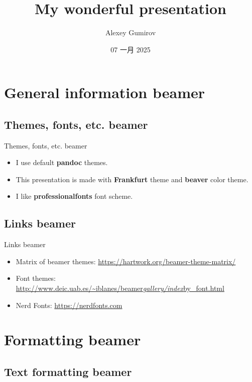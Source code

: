\documentclass[
  ignorenonframetext,
  aspectratio=169,
  aspectratio=169]{beamer}
\title{My wonderful presentation}
\author{Alexey Gumirov}
\date{07 一月 2025}
\institute{My home office}
\providecommand{\tightlist}{%
  \setlength{\itemsep}{0pt}\setlength{\parskip}{0pt}}
\providecommand{\tightlist}{%
  \setlength{\itemsep}{0pt}\setlength{\parskip}{0pt}}
\begin{document}
\frame{\titlepage}

\begin{frame}
  \tableofcontents[hideallsubsections]
\end{frame}
\section{General information beamer}\label{general-information-beamer}

\subsection{Themes, fonts, etc. beamer}\label{themes-fonts-etc.-beamer}

\begin{frame}{Themes, fonts, etc. beamer}
\begin{itemize}
\tightlist
\item
  I use default \textbf{pandoc} themes.
\item
  This presentation is made with \textbf{Frankfurt} theme and
  \textbf{beaver} color theme.
\item
  I like \textbf{professionalfonts} font scheme.
\end{itemize}
\end{frame}

\subsection{Links beamer}\label{links-beamer}

\begin{frame}{Links beamer}
\begin{itemize}
\tightlist
\item
  Matrix of beamer themes:
  \url{https://hartwork.org/beamer-theme-matrix/}
\item
  Font themes:
  \href{http://www.deic.uab.es/~iblanes/beamer_gallery/index_by_font.html}{http://www.deic.uab.es/\textasciitilde iblanes/beamer\emph{gallery/index}by\_font.html}
\item
  Nerd Fonts: \url{https://nerdfonts.com}
\end{itemize}
\end{frame}

\section{Formatting beamer}\label{formatting-beamer}

\subsection{Text formatting beamer}\label{text-formatting-beamer}
\end{document}
